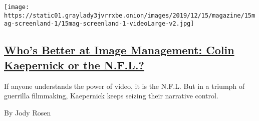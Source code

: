 \begin{enumerate}
  \texttt{[image: https://static01.graylady3jvrrxbe.onion/images/2019/12/15/magazine/15mag-screenland-1/15mag-screenland-1-videoLarge-v2.jpg]}

  \hypertarget{whos-better-at-image-management-colin-kaepernick-or-the-nfl}{%
  \subsection{\texorpdfstring{\href{/2019/12/12/magazine/colin-kaepernick-nfl-video.html}{Who's
  Better at Image Management: Colin Kaepernick or the
  N.F.L.?}}{Who's Better at Image Management: Colin Kaepernick or the N.F.L.?}}\label{whos-better-at-image-management-colin-kaepernick-or-the-nfl}}

  If anyone understands the power of video, it is the N.F.L. But in a
  triumph of guerrilla filmmaking, Kaepernick keeps seizing their
  narrative control.

  By Jody Rosen
\end{enumerate}

